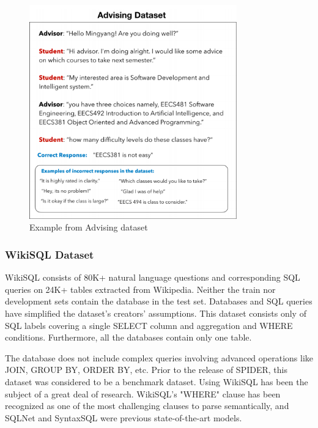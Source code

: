 \begin{figure}[htb]
    \centering
    \includegraphics[width=0.8\textwidth]{pics/db/Advising.png}
    \caption{Example from Advising dataset}
    \label{fig:Advising}
\end{figure}

\subsubsection*{WikiSQL Dataset}

WikiSQL consists of 80K+ natural language questions and corresponding SQL queries on 24K+ tables extracted from Wikipedia. Neither the train nor development sets contain the database in the test set. Databases and SQL queries have simplified the dataset's creators' assumptions. This dataset consists only of SQL labels covering a single SELECT column and aggregation and WHERE conditions. Furthermore, all the databases contain only one table.

The database does not include complex queries involving advanced operations like JOIN, GROUP BY, ORDER BY, etc. Prior to the release of SPIDER, this dataset was considered to be a benchmark dataset. Using WikiSQL has been the subject of a great deal of research. WikiSQL's "WHERE" clause has been recognized as one of the most challenging clauses to parse semantically, and SQLNet and SyntaxSQL were previous state-of-the-art models.


